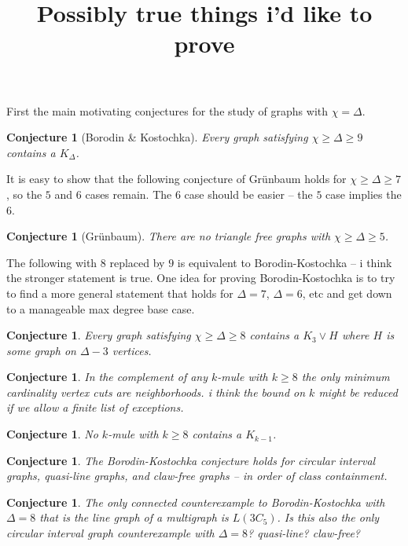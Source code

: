 \documentclass[12pt]{article}
\title{Possibly true things i'd like to prove}
\theoremstyle{plain}
\newtheorem{conjecture}[thm]{Conjecture}
\theoremstyle{definition}
\theoremstyle{remark}
\begin{document}
\maketitle

First the main motivating conjectures for the study of graphs with $\chi = \Delta$.
\begin{conjecture}[Borodin \& Kostochka]
Every graph satisfying $\chi \geq \Delta \geq 9$ contains a $K_\Delta$.
\end{conjecture}

It is easy to show that the following conjecture of Gr\"unbaum holds for $\chi \geq \Delta \geq 7$, so the $5$ and $6$ cases remain.  The $6$ case should be easier -- the $5$ case implies the $6$.

\begin{conjecture}[Gr\"unbaum]
There are no triangle free graphs with $\chi \geq \Delta \geq 5$.
\end{conjecture}

The following with $8$ replaced by $9$ is equivalent to Borodin-Kostochka -- i think the stronger statement is true.  One idea for proving Borodin-Kostochka is to try to find a more general statement that holds for $\Delta = 7$, $\Delta = 6$, etc and get down to a manageable max degree base case.
\begin{conjecture}
Every graph satisfying $\chi \geq \Delta \geq 8$ contains a $K_3 \vee H$ where $H$ is some graph on $\Delta - 3$ vertices.
\end{conjecture}

\begin{conjecture}
In the complement of any $k$-mule with $k \geq 8$ the only minimum cardinality vertex cuts are neighborhoods.  i think the bound on $k$ might be reduced if we allow a finite list of exceptions.
\end{conjecture}

\begin{conjecture}
No $k$-mule with $k \geq 8$ contains a $K_{k-1}$.
\end{conjecture}

\begin{conjecture}
The Borodin-Kostochka conjecture holds for circular interval graphs, quasi-line graphs, and claw-free graphs -- in order of class containment.
\end{conjecture}

\begin{conjecture}
The only connected counterexample to Borodin-Kostochka with $\Delta = 8$ that is the line graph of a multigraph is $L(3C_5)$.  Is this also the only circular interval graph counterexample with $\Delta = 8$?  quasi-line? claw-free?
\end{conjecture}
\end{document}
